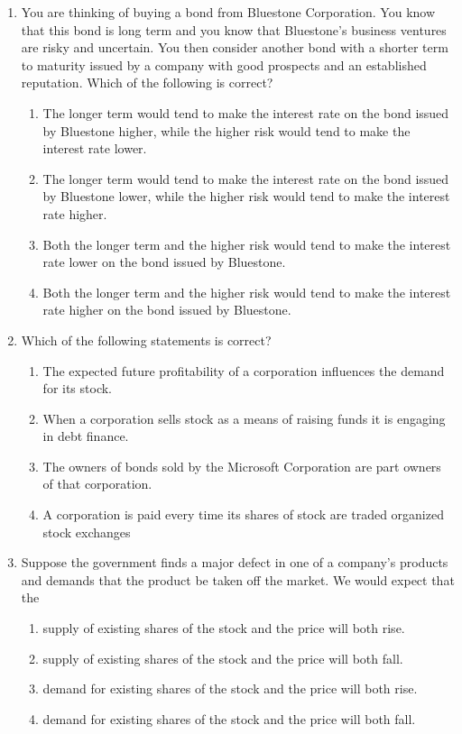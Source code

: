 \documentclass{article}
\begin{document}
\begin{enumerate}
\item You are thinking of buying a bond from Bluestone Corporation. You know that this bond is long term and you know that
Bluestone's business ventures are risky and uncertain. You then consider another bond with a shorter term to maturity
issued by a company with good prospects and an established reputation. Which of the following is correct?
	\begin{enumerate}
	\item The longer term would tend to make the interest rate on the bond issued by Bluestone higher, while the higher
risk would tend to make the interest rate lower.
	\item The longer term would tend to make the interest rate on the bond issued by Bluestone lower, while the higher
risk would tend to make the interest rate higher.
	\item Both the longer term and the higher risk would tend to make the interest rate lower on the bond issued by
Bluestone.
	\item Both the longer term and the higher risk would tend to make the interest rate higher on the bond issued by
Bluestone.
	\end{enumerate}
	
\newpage
	
\item Which of the following statements is correct?
	\begin{enumerate}
	\item The expected future profitability of a corporation influences the demand for its stock.
	\item When a corporation sells stock as a means of raising funds it is engaging in debt finance.
	\item The owners of bonds sold by the Microsoft Corporation are part owners of that corporation.
	\item A corporation is paid every time its shares of stock are traded organized stock exchanges
	\end{enumerate}
	
\item Suppose the government finds a major defect in one of a company's products and demands that the product be taken
off the market. We would expect that the
	\begin{enumerate}
	\item supply of existing shares of the stock and the price will both rise.
	\item supply of existing shares of the stock and the price will both fall.
	\item demand for existing shares of the stock and the price will both rise.
	\item demand for existing shares of the stock and the price will both fall.
	\end{enumerate}
	

\end{enumerate}
\end{document}
